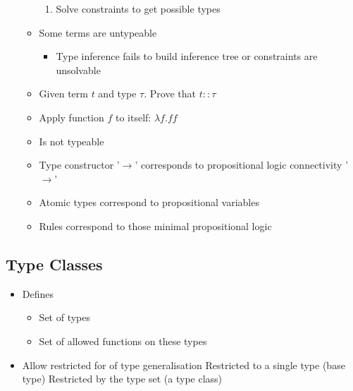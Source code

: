 \begin{itemize}
\begin{itemize}
\begin{enumerate}
                    \item Solve constraints to get possible types
                \end{enumerate}
            \item Some terms are untypeable
                \begin{itemize}
                    \item Type inference fails to build inference tree or constraints are unsolvable
                \end{itemize}
        \end{itemize}
        \begin{itemize}
            \item Given term $t$ and type $\tau$. Prove that $t :: \tau$
        \end{itemize}
        \begin{itemize}
            \item Apply function $f$ to itself: $\lambda f. f f$
            \item Is not typeable
        \end{itemize}
        \begin{itemize}
            \item Type constructor '$\to$' corresponds to propositional logic connectivity '$\to$'
            \item Atomic types correspond to propositional variables
            \item Rules correspond to those minimal propositional logic
        \end{itemize}
\end{itemize}

\subsection{Type Classes}
\begin{itemize}
    \item Defines
        \begin{itemize}
            \item Set of types
            \item Set of allowed functions on these types
        \end{itemize}
    \item Allow restricted for of type generalisation
     Restricted to a single type (base type)
     Restricted by the type set (a type class)
\end{itemize}

